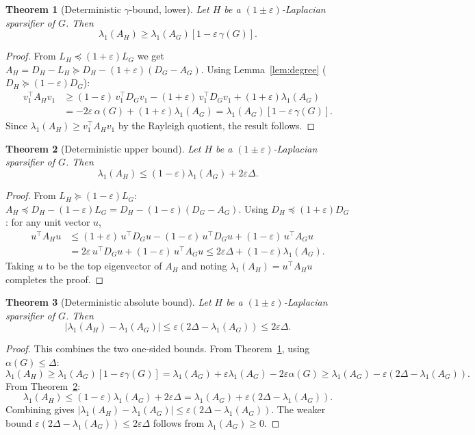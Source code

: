 \documentclass[11pt]{article}
\newtheorem{theorem}{Theorem}[section]
\theoremstyle{definition}
\newcommand{\eps}{\varepsilon}
\newcommand{\lamH}{\lambda_1(A_H)}
\newcommand{\lamG}{\lambda_1(A_G)}
\newcommand{\AG}{A_G}
\newcommand{\AH}{A_H}
\newcommand{\LG}{L_G}
\newcommand{\LH}{L_H}
\newcommand{\vone}{v_1}
\begin{document}
\begin{theorem}[Deterministic $\gamma$-bound, lower]\label{thm:gamma-lower}
Let $H$ be a $(1\pm\eps)$-Laplacian sparsifier of $G$. Then
\[
\lamH \geq \lamG\!\left[1 - \eps\,\gamma(G)\right].
\]
\end{theorem}
\begin{proof}
From $\LH \preceq (1+\eps)\LG$ we get
$\AH = D_H - \LH \succeq D_H - (1+\eps)(D_G - \AG)$.
Using Lemma~\ref{lem:degree} ($D_H \succeq (1-\eps)D_G$):
\begin{align*}
\vone^\top \AH \vone
&\geq (1-\eps)\,\vone^\top D_G \vone - (1+\eps)\,\vone^\top D_G \vone + (1+\eps)\lamG \\
&= -2\eps\,\alpha(G) + (1+\eps)\lamG
= \lamG\!\left[1 - \eps\,\gamma(G)\right].
\end{align*}
Since $\lamH \geq \vone^\top \AH \vone$ by the Rayleigh quotient, the result follows.
\end{proof}

\begin{theorem}[Deterministic upper bound]\label{thm:det-upper}
Let $H$ be a $(1\pm\eps)$-Laplacian sparsifier of $G$. Then
\[
\lamH \leq (1-\eps)\lamG + 2\eps\Delta.
\]
\end{theorem}
\begin{proof}
From $\LH \succeq (1-\eps)\LG$:
$\AH \preceq D_H - (1-\eps)\LG = D_H - (1-\eps)(D_G - \AG)$.
Using $D_H \preceq (1+\eps)D_G$: for any unit vector $u$,
\begin{align*}
u^\top \AH u
&\leq (1+\eps)\,u^\top D_G u - (1-\eps)\,u^\top D_G u + (1-\eps)\,u^\top \AG u \\
&= 2\eps\,u^\top D_G u + (1-\eps)\,u^\top \AG u
\leq 2\eps\Delta + (1-\eps)\lamG.
\end{align*}
Taking $u$ to be the top eigenvector of $\AH$ and noting
$\lamH = u^\top \AH u$ completes the proof.
\end{proof}

\begin{theorem}[Deterministic absolute bound]\label{thm:abs-det}
Let $H$ be a $(1\pm\eps)$-Laplacian sparsifier of $G$. Then
\[
|\lamH - \lamG| \leq \eps(2\Delta - \lamG) \leq 2\eps\Delta.
\]
\end{theorem}
\begin{proof}
This combines the two one-sided bounds.
From Theorem~\ref{thm:gamma-lower}, using $\alpha(G) \leq \Delta$:
\[
\lamH \geq \lamG[1 - \eps\gamma(G)]
= \lamG + \eps\lamG - 2\eps\alpha(G)
\geq \lamG - \eps(2\Delta - \lamG).
\]
From Theorem~\ref{thm:det-upper}:
\[
\lamH \leq (1-\eps)\lamG + 2\eps\Delta = \lamG + \eps(2\Delta - \lamG).
\]
Combining gives $|\lamH - \lamG| \leq \eps(2\Delta - \lamG)$.
The weaker bound $\eps(2\Delta - \lamG) \leq 2\eps\Delta$ follows from $\lamG \geq 0$.
\end{proof}
\end{document}
